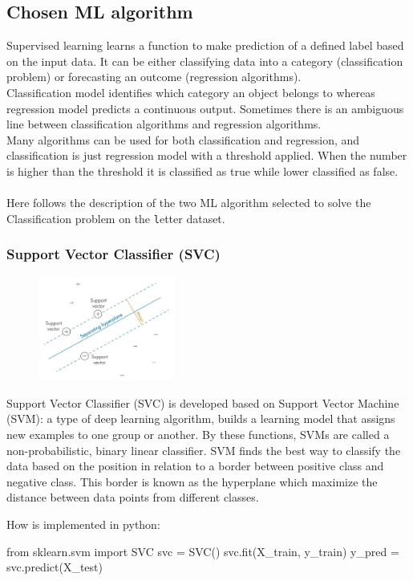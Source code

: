 \documentclass{article}
\begin{document}
\subsection{Chosen ML algorithm}\label{sec:model}
Supervised learning learns a function to make prediction of a defined label based on the input data. It can be either classifying data into a category (classification problem) or forecasting an outcome (regression algorithms).\\
Classification model identifies which category an object belongs to whereas regression model predicts a continuous output. Sometimes there is an ambiguous line between classification algorithms and regression algorithms.\\
Many algorithms can be used for both classification and regression, and classification is just regression model with a threshold applied. When the number is higher than the threshold it is classified as true while lower classified as false. \\\\
Here follows the description of the two ML algorithm selected to solve the Classification problem on the {\texttt letter} dataset.

\subsubsection*{Support Vector Classifier (SVC)}
\begin{multicols}{2}
\begin{figure}[H]
        \begin{center}
        \includegraphics[width=0.4\textwidth]{SVC.jpeg}
        \end{center}
    \end{figure} 
    \columnbreak
\columnbreak
Support Vector Classifier (SVC) is developed based on Support Vector Machine (SVM): a type of deep learning algorithm, builds a learning model that assigns new examples to one group or another. By these functions, SVMs are called a non-probabilistic, binary linear classifier. SVM finds the best way to classify the data based on the position in relation to a border between positive class and negative class. This border is known as the hyperplane which maximize the distance between data points from different classes.
\end{multicols}
\begin{center}
How is implemented in python:
\begin{Python}
from sklearn.svm import SVC
svc = SVC()
svc.fit(X_train, y_train)
y_pred = svc.predict(X_test)
\end{Python}
\end{center}
\end{document}

